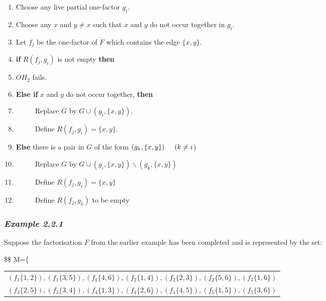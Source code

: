 \documentclass[
  12pt,
  a4paper]{book}
\begin{document}
\begin{enumerate}
\def\labelenumi{\arabic{enumi}.}
\item
  Choose any live partial one-factor \(g_i\).
\item
  Choose any \(x\) and \(y \neq x\) such that \(x\) and \(y\) do not
  occur together in \(g_i\).
\item
  Let \(f_j\) be the one-factor of \(F\) which contains the edge
  \(\{x,y\}\).
\item
  \textbf{if} \(R(f_j,g_i)\) is not empty \textbf{then}
\item
  \(OH_2\) fails.
\item
  \textbf{Else if} \(x\) and \(y\) do not occur together, \textbf{then}
\item
  \(\hspace{1cm}\) Replace \(G\) by \(G \cup (g_i,\{x,y\})\).
\item
  \(\hspace{1cm}\) Define \(R(f_j,g_i)=\{x,y\}\).
\item
  \textbf{Else} there is a pair in \(G\) of the form
  \((g_k,\{x,y\}) \hspace{0.5cm} (k \neq i\))
\item
  \(\hspace{1cm}\) Replace \(G\) by
  \(G \cup (g_i,\{x,y\}) \backslash (g_k,\{x,y\})\)
\item
  \(\hspace{1cm}\) Define \(R(f_j,g_i)=\{x,y\}\)
\item
  \(\hspace{1cm}\) Define \(R(f_j,g_k)\) to be empty
\end{enumerate}

\hypertarget{example-2.2.1}{%
\subsubsection{\texorpdfstring{\emph{Example
2.2.1}}{Example 2.2.1}}\label{example-2.2.1}}

Suppose the factorisation \(F\) from the earlier example has been
completed and is represented by the set:

\$\$ M=\{

\begin{longtable}[]{@{}l@{}}
\toprule
\endhead
\((f_1\{1,2\}),(f_1\{3,5\}),(f_1\{4,6\}),(f_2\{1,4\}),(f_2\{2,3\}),(f_2\{5,6\}),(f_3\{1,6\})\)\tabularnewline
\((f_3\{2,5\}),(f_3\{3,4\}),(f_4\{1,3\}),(f_4\{2,6\}),(f_4\{4,5\}),(f_5\{1,5\}),(f_5\{3,6\})\)\tabularnewline
\bottomrule
\end{longtable}
\end{document}
